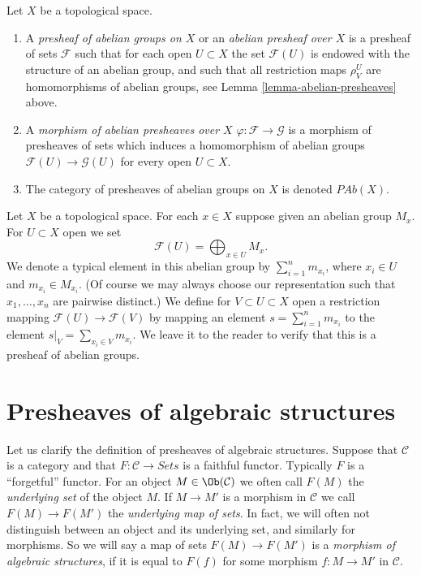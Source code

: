 \begin{definition}
\label{definition-abelian-presheaves}
Let $X$ be a topological space.
\begin{enumerate}
\item A {\it presheaf of abelian groups on $X$} or an
{\it abelian presheaf over $X$}
is a presheaf of sets $\mathcal{F}$ such that for each open
$U \subset X$ the set $\mathcal{F}(U)$ is endowed with
the structure of an abelian group, and such that all restriction
maps $\rho^U_V$ are homomorphisms of abelian groups, see
Lemma \ref{lemma-abelian-presheaves} above.
\item A {\it morphism of abelian presheaves over $X$}
$\varphi : \mathcal{F} \to \mathcal{G}$ is a morphism of presheaves
of sets which induces
a homomorphism of abelian groups $\mathcal{F}(U) \to \mathcal{G}(U)$
for every open $U \subset X$.
\item The category of presheaves of abelian groups on $X$ is denoted
$\textit{PAb}(X)$.
\end{enumerate}
\end{definition}

\begin{example}
\label{example-direct-sum-points}
Let $X$ be a topological space. For each $x \in X$ suppose
given an abelian group $M_x$. For $U \subset X$ open
we set
$$
\mathcal{F}(U) = \bigoplus\nolimits_{x \in U} M_x.
$$
We denote a typical element in this abelian group by
$\sum_{i = 1}^n m_{x_i}$, where $x_i \in U$ and $m_{x_i} \in M_{x_i}$.
(Of course we may always choose our representation such that
$x_1, \ldots, x_n$ are pairwise distinct.)
We define for $V \subset U \subset X$ open a restriction
mapping $\mathcal{F}(U) \to \mathcal{F}(V)$ by
mapping an element $s = \sum_{i = 1}^n m_{x_i}$
to the element $s|_V = \sum_{x_i \in V} m_{x_i}$.
We leave it to the reader to verify that this is a
presheaf of abelian groups.
\end{example}



\section{Presheaves of algebraic structures}
\label{section-presheaves-structures}

\noindent
Let us clarify the definition
of presheaves of algebraic structures.
Suppose that $\mathcal{C}$ is a category and
that $F : \mathcal{C} \to \textit{Sets}$ is
a faithful functor. Typically $F$ is a ``forgetful''
functor. For an object $M \in \Ob(\mathcal{C})$
we often call $F(M)$ the {\it underlying set} of the
object $M$. If $M \to M'$ is a morphism in $\mathcal{C}$
we call $F(M) \to F(M')$ the {\it underlying map of sets}.
In fact, we will often not distinguish between an object
and its underlying set, and similarly for morphisms.
So we will say a map of sets $F(M) \to F(M')$
is a {\it morphism of algebraic structures}, if it is
equal to $F(f)$ for some morphism $f : M \to M'$
in $\mathcal{C}$.

